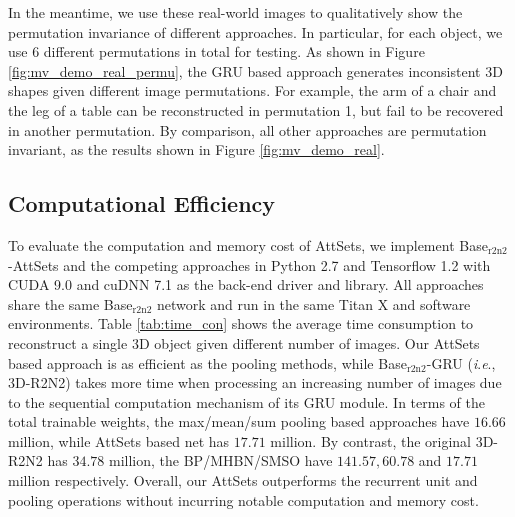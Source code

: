 \documentclass[twocolumn]{svjour3}    \pdfoutput=1
\newcommand{\nickname}{AttSets}
\newcommand{\ie}{\textit{i}.\textit{e}., }
\begin{document}
In the meantime, we use these real-world images to qualitatively show the permutation invariance of different approaches. In particular, for each object, we use 6 different permutations in total for testing. As shown in Figure \ref{fig:mv_demo_real_permu}, the GRU based approach generates inconsistent 3D shapes given different image permutations. For example, the arm of a chair and the leg of a table can be reconstructed in permutation 1, but fail to be recovered in another permutation. By comparison, all other approaches are permutation invariant, as the results shown in Figure \ref{fig:mv_demo_real}.

\vspace{-0.75cm}
\subsection{Computational Efficiency}
To evaluate the computation and memory cost of \nickname{}, we implement Base$_{\textrm{r2n2}}$-AttSets and the competing approaches in Python 2.7 and Tensorflow 1.2 with CUDA 9.0 and cuDNN 7.1 as the back-end driver and library. All approaches share the same Base$_{\textrm{r2n2}}$ network and run in the same Titan X and software environments. Table \ref{tab:time_con} shows the average time consumption to reconstruct a single 3D object given different number of images. Our \nickname{} based approach is as efficient as the pooling methods, while Base$_{\textrm{r2n2}}$-GRU (\ie 3D-R2N2) takes more time when processing an increasing number of images due to the sequential computation mechanism of its GRU module. In terms of the total trainable weights, the max/mean/sum pooling based approaches have $16.66$ million, while \nickname{} based net has $17.71$ million. By contrast, the original 3D-R2N2 has $34.78$ million, the BP/MHBN/SMSO have $141.57, 60.78$ and $17.71$ million respectively. Overall, our \nickname{} outperforms the recurrent unit and pooling operations without incurring notable computation and memory cost.
\end{document}
